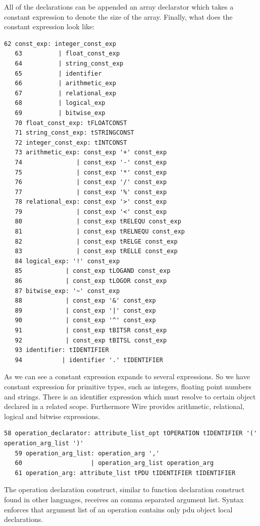 \documentclass[times, utf8, diplomski]{fer}
\begin{document}
All of the declarations can be appended an array declarator which takes a constant 
expression to denote the size of the array.
Finally, what does the constant expression look like:
\lstset{language=IDL}
\lstset{basicstyle=\tiny}
\begin{lstlisting}[frame=tb]
   62 const_exp: integer_const_exp
   63          | float_const_exp 
   64          | string_const_exp
   65          | identifier
   66          | arithmetic_exp
   67          | relational_exp
   68          | logical_exp
   69          | bitwise_exp
   70 float_const_exp: tFLOATCONST
   71 string_const_exp: tSTRINGCONST
   72 integer_const_exp: tINTCONST
   73 arithmetic_exp: const_exp '+' const_exp
   74               | const_exp '-' const_exp
   75               | const_exp '*' const_exp
   76               | const_exp '/' const_exp
   77               | const_exp '%' const_exp
   78 relational_exp: const_exp '>' const_exp
   79               | const_exp '<' const_exp
   80               | const_exp tRELEQU const_exp 
   81               | const_exp tRELNEQU const_exp
   82               | const_exp tRELGE const_exp
   83               | const_exp tRELLE const_exp
   84 logical_exp: '!' const_exp
   85            | const_exp tLOGAND const_exp
   86            | const_exp tLOGOR const_exp
   87 bitwise_exp: '~' const_exp
   88            | const_exp '&' const_exp   
   89            | const_exp '|' const_exp   
   90            | const_exp '^' const_exp   
   91            | const_exp tBITSR const_exp
   92            | const_exp tBITSL const_exp
   93 identifier: tIDENTIFIER
   94           | identifier '.' tIDENTIFIER
\end{lstlisting}

As we can see a constant expression expands to several expressions. So we have 
constant expression for primitive types, such as integers, floating point numbers 
and strings. There is an identifier expression which must resolve to certain object 
declared in a related scope. Furthermore Wire provides arithmetic, relational, 
logical and bitwise expressions.
\lstset{language=IDL}
\lstset{basicstyle=\tiny}
\begin{lstlisting}[frame=tb]
   58 operation_declarator: attribute_list_opt tOPERATION tIDENTIFIER '(' operation_arg_list ')'
   59 operation_arg_list: operation_arg ','
   60                   | operation_arg_list operation_arg
   61 operation_arg: attribute_list tPDU tIDENTIFIER tIDENTIFIER
\end{lstlisting}
The operation declaration construct, similar to function declaration construct
found in other languages, receives an comma separated argument list. Syntax enforces
that argument list of an operation contains only pdu object local declarations.
\end{document}
